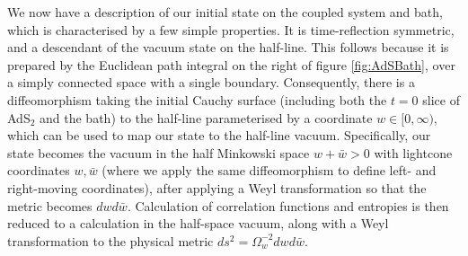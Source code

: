\documentclass[12pt]{article}
\begin{document}
We now have a description of our initial state on the coupled system and bath, which is characterised by a few simple properties. It is time-reflection symmetric, and a descendant of the vacuum state on the half-line. This follows because it is prepared by the Euclidean path integral on the right of figure \ref{fig:AdSBath}, over a simply connected space with a single boundary. Consequently, there is a diffeomorphism taking the initial Cauchy surface (including both the $t=0$ slice of AdS$_2$ and the bath) to the half-line parameterised by a coordinate $w\in [0,\infty)$, which can be used to map our state to the half-line vacuum. Specifically, our state becomes the vacuum in the half Minkowski space $w+\bar{w}>0$ with lightcone coordinates $w,\bar{w}$ (where we apply the same diffeomorphism to define left- and right-moving coordinates), after applying a Weyl transformation so that the metric becomes $dw d\bar{w}$. Calculation of correlation functions and entropies is then reduced to a calculation in the half-space vacuum, along with a Weyl transformation to the physical metric $ds^2 = \Omega_w^{-2} dwd\bar{w}$.
\end{document}
